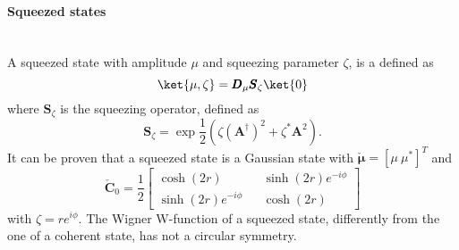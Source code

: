     \paragraph{Squeezed states}\mbox{} \\
    \label{squeezedStates}
    A squeezed state with amplitude $\mu$ and squeezing parameter $\zeta$, is a defined as 
    \cite{tesiGuerrini,YuenRadField,QMnoiseInterf}
    \begin{equation}
        \ket{\mu,\zeta}=\pmb{D}_\mu\pmb{S}_\zeta\ket{0}
    \end{equation}
    where $\pmb{S}_\zeta$ is the squeezing operator, defined as
    \begin{equation}
        \pmb{S}_\zeta=\exp{\frac{1}{2}\left(\zeta\left(\pmb{A}^\dagger\right)^2+
        \zeta^*\pmb{A}^2\right)}.
    \end{equation}
    It can be proven that a squeezed state is a Gaussian state with $\check{\pmb{\mu}}=[\mu\ \mu^*]^T$
    and
    \begin{equation*}
        \check{\pmb{C}}_0=\frac{1}{2}
        \begin{bmatrix}
            \cosh(2r) && \sinh(2r)e^{-i\phi}\\
            \sinh(2r)e^{-i\phi} && \cosh(2r)
        \end{bmatrix}
    \end{equation*}
    with $\zeta=re^{i\phi}$.
    The Wigner W-function of a squeezed state, differently from the one of a coherent state, has not a 
    circular symmetry.

